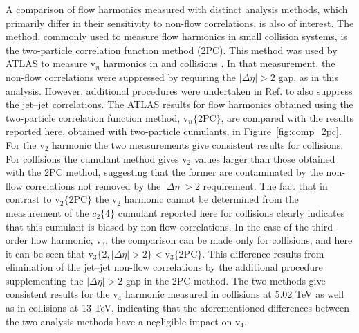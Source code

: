 \documentclass[cernpreprint,texlive=2014,txfonts,UKenglish]{latex/atlasdoc}
\begin{document}
A comparison of flow harmonics measured with distinct analysis methods, which primarily differ in their sensitivity to non-flow correlations, is also of interest. The method, commonly used to measure flow harmonics in small collision systems, is the two-particle correlation function method (2PC). This method was used by ATLAS  to measure $\mathrm{v}_n$ harmonics in \pp and \pPb collisions \cite{ppatlas2}.  In that measurement,  the non-flow correlations were suppressed by requiring the $|\Delta\eta|>2$ gap, as in this analysis.  However, additional procedures were undertaken in  Ref. \cite{ppatlas2} to also suppress the jet--jet correlations. The ATLAS results for flow harmonics obtained using the two-particle correlation function method, $\mathrm{v}_n\{2\mathrm{PC}\}$, are compared with the results reported here, obtained with two-particle cumulants,  in Figure~\ref{fig:comp_2pc}. For the $\mathrm{v}_2$ harmonic the two measurements give consistent results for \pPb collisions. For \pp collisions the cumulant method gives $\mathrm{v}_2$ values larger than those obtained with the 2PC method, suggesting that the former are contaminated by the non-flow correlations not removed by the $|\Delta\eta|>2$ requirement. The fact that in contrast to $\mathrm{v}_2 \{2\mathrm{PC}\}$ the $\mathrm{v}_2$ harmonic  cannot be determined from the measurement of the $c_2\{4\}$ cumulant reported here for \pp collisions  clearly indicates that this cumulant is biased by non-flow correlations. In the case of the third-order flow harmonic, $\mathrm{v}_3$, the comparison can be made only for \pPb collisions, and here it can be seen that $\mathrm{v}_3\{2,|\Delta\eta|>2\} < \mathrm{v}_3\{2\mathrm{PC}\} $. This difference results from elimination of the jet--jet non-flow correlations by the additional procedure supplementing the $|\Delta\eta|>2$ gap in the 2PC method.  The two methods give consistent results for the $\mathrm{v}_4$ harmonic measured in \pPb collisions at 5.02 TeV as well as in \pp collisions at 13 TeV, indicating that the aforementioned differences between the two analysis methods have a negligible impact on $\mathrm{v}_4$.


\FloatBarrier


\end{document}
